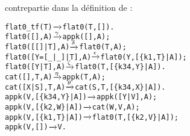 contrepartie dans la définition de :
\begin{alltt}
flat0\_tf(T)          \(\smashedrightarrow{\phantom{\gamma}}\) flat0(T,[]).
flat0(       [],A)   \(\smashedrightarrow{\gamma}\) appk([],A);
flat0(   [[]|T],A)   \(\smashedrightarrow{\delta}\) flat0(T,A);
flat0([Y=[\_|\_]|T],A) \(\smashedrightarrow{\epsilon}\) flat0(Y,[\{k1,T\}|A]);
flat0(    [Y|T],A)   \(\smashedrightarrow{\zeta}\) flat0(T,[\{k34,Y\}|A]).
cat(   [],T,A)       \(\smashedrightarrow{\eta}\) appk(T,A);
cat([X|S],T,A)       \(\smashedrightarrow{\theta}\) cat(S,T,[\{k34,X\}|A]).
appk(V,[\{k34,Y\}|A])  \(\smashedrightarrow{\phantom{\theta}}\) appk([Y|V],A);
appk(V, [\{k2,W\}|A])  \(\smashedrightarrow{\phantom{\theta}}\) cat(W,V,A);
appk(V, [\{k1,T\}|A])  \(\smashedrightarrow{\phantom{\theta}}\) flat0(T,[\{k2,V\}|A]);
appk(V,         [])  \(\smashedrightarrow{\phantom{\theta}}\) V.
\end{alltt}

